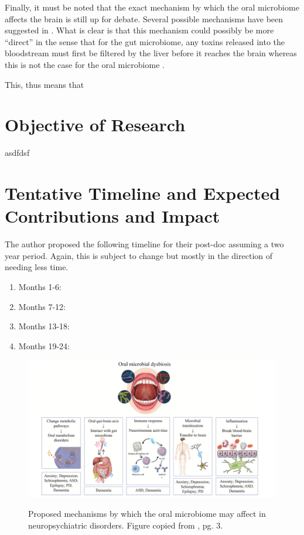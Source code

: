 \documentclass{article}
\begin{document}
\begin{multicols}{2}
 Finally, it must be noted that the exact mechanism by which the oral microbiome affects the brain is still up for debate. Several possible mechanisms have been suggested in \cite{tao_relationship_2024}. What is clear is that this mechanism could possibly be more ``direct'' in the sense that for the gut microbiome, any toxins released into the bloodstream must first be filtered by the liver before it reaches the brain whereas this is not the case for the oral microbiome \cite{tao_relationship_2024}. 
 
 This, thus means that
\section{Objective of Research}
asdfdsf
\section{Tentative Timeline and Expected Contributions and Impact}
The author proposed the following timeline for their post-doc assuming a two year period. Again, this is subject to change but mostly in the direction of needing less time. 
\begin{enumerate}[label = \roman*.]
	\item Months 1-6:
	\item Months 7-12:
	\item Months 13-18:
	\item Months 19-24:
\end{enumerate}
\begin{figure}[t]
\includegraphics[width = \textwidth]{../figures/dysbiosis-oral-diagram.png}
\label{mouth}
\caption{Proposed mechanisms by which the oral microbiome may affect in neuropsychiatric disorders. Figure copied from \cite{tao_relationship_2024}, pg. 3.}
\end{figure}


\end{multicols}
\end{document}
